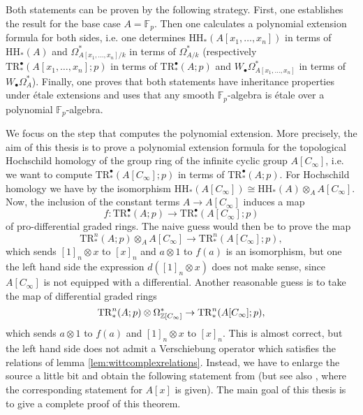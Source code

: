 Both statements can be proven by the following strategy.
First, one establishes the result for the base case $A = \mathbb{F}_p$.
Then one calculates a polynomial extension formula for both sides,
i.e. one determines $\mathrm{HH}_\ast(A[x_1,\ldots, x_n])$ in terms of
$\mathrm{HH}_\ast (A)$ and $\Omega^\ast_{A[x_1,\ldots, x_n]/k}$
in terms of $\Omega^\ast_{A/k}$ (respectively $\mathrm{TR}^\bullet_\ast(A[x_1,\ldots, x_n];p)$
in terms of $\mathrm{TR}^\bullet_\ast(A;p)$
and $W_\bullet \Omega^\ast_{A[x_1,\ldots, x_n]}$ in terms of
$W_\bullet \Omega^\ast_{A}$). Finally, one proves that both
statements have inheritance properties under \'etale extensions
and uses that any smooth $\mathbb{F}_p$-algebra
is \'etale over a polynomial $\mathbb{F}_p$-algebra.

We focus on the step that computes the polynomial extension.
More precisely, the aim of this thesis is to prove a polynomial extension formula
for the topological Hochschild homology of the group ring of the infinite cyclic group $A[C_\infty]$, 
i.e. we want to compute $\mathrm{TR}^\bullet_\ast(A[C_\infty];p)$
in terms of $\mathrm{TR}^\bullet_\ast(A;p)$.
For Hochschild homology we have by
\cite[Theorem~0.1, \pno~368]{wghochschilddescent}
the isomorphism $\mathrm{HH}_\ast(A[C_\infty])\cong \mathrm{HH}_\ast(A)\otimes_A A[C_\infty]$.
Now, the inclusion of the constant terms $A\to A[C_\infty]$ induces a map
\[f:\mathrm{TR}^\bullet_\ast(A;p)\to \mathrm{TR}^\bullet_\ast(A[C_\infty];p)\]
of pro-differential graded rings.
The naive guess would then be to prove the map
\[
\mathrm{TR}^n_\ast(A;p)\otimes_A A[C_\infty]\to \mathrm{TR}^n_\ast(A[C_\infty];p),
\]
which sends $[1]_n\otimes x$ to $[x]_n$ and $a\otimes 1$ to $f(a)$ is an isomorphism,
but one the left hand side the expression $d([1]_n\otimes x)$ does not make
sense, since $A[C_\infty]$ is not equipped with a differential. Another
reasonable guess is to take the map of differential graded rings
\[
\mathrm{TR}^n_\ast(A;p)\otimes \Omega^\ast_{\mathbb{Z}[C_\infty]}\to \mathrm{TR}^n_\ast(A[C_\infty];p),
\]
which sends $a\otimes 1$ to $f(a)$ and $[1]_n\otimes x$ to $[x]_n$. This is almost correct,
but the left hand side does not admit a Verschiebung operator which satisfies
the relations of lemma \ref{lem:wittcomplexrelations}. Instead, we have to enlarge
the source a little bit and obtain the following statement from \cite[Theorem~2, \pno~139]{hesselholtwhitehead}
(but see also
\cite[Theorem~C, \pno~4]{hmmixed}, where the corresponding statement for $A[x]$ is given). 
The main goal of this thesis is to give a complete proof of this theorem.
